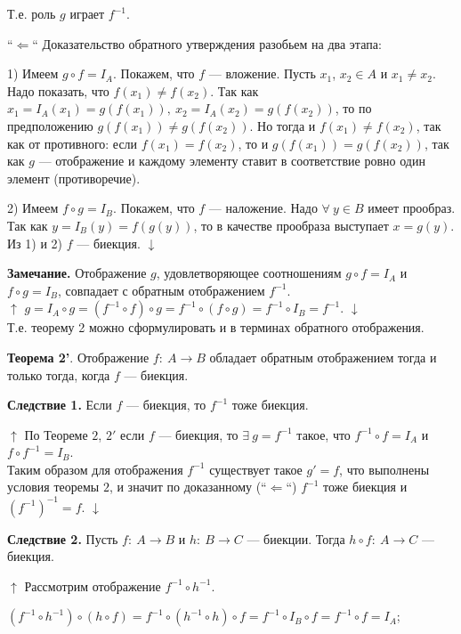 \documentclass{article}
\begin{document}
    Т.е. роль $g$ играет $f^{-1}$.

    ``$\Leftarrow$`` Доказательство обратного утверждения разобьем на два этапа:

    1) Имеем $g \circ f = I_A$. Покажем, что $f$ --- вложение. Пусть $x_1$, $x_2 \in A$ и $x_1 \neq x_2$. Надо показать, что $f(x_1) \neq f(x_2)$. Так как $x_1 = I_A(x_1) = g(f(x_1)),\ x_2 = I_A(x_2) = g(f(x_2))$, то по предположению $g(f(x_1)) \neq g(f(x_2))$. Но тогда и $f(x_1) \neq f(x_2)$, так как от противного: если $f(x_1) = f(x_2)$, то и $g(f(x_1)) = g(f(x_2))$, так как $g$ --- отображение и каждому элементу ставит в соответствие ровно один элемент (противоречие).

    2) Имеем $f \circ g = I_B$. Покажем, что $f$ --- наложение. Надо $\forall\ y \in B$ имеет прообраз.\\
    Так как $y = I_B(y) = f(g(y))$, то в качестве прообраза выступает $x = g(y)$.\\
    Из 1) и 2) $f$ --- биекция. $\downarrow$
    
    \textbf{Замечание.} Отображение $g$, удовлетворяющее соотношениям $g \circ f = I_A$ и $f \circ g = I_B$, совпадает с обратным отображением $f^{-1}$.\\
    $\uparrow$ $g = I_A \circ g = (f^{-1} \circ f) \circ g = f^{-1} \circ (f \circ g) = f^{-1} \circ I_B = f^{-1}$. $\downarrow$\\
    Т.е. теорему 2 можно сформулировать и в терминах обратного отображения.

    \textbf{Теорема 2'}. Отображение $f:\ A \rightarrow B$ обладает обратным отображением тогда и только тогда, когда $f$ --- биекция.
    
    \textbf{Следствие 1.} Если $f$ --- биекция, то $f^{-1}$ тоже биекция.

    $\uparrow$ По Теореме $2$, $2'$ если $f$ --- биекция, то $\exists\ g = f^{-1}$ такое, что $f^{-1} \circ f = I_A$ и $f \circ f^{-1} = I_B$.\\
    Таким образом для отображения $f^{-1}$ существует такое $g' = f$, что выполнены условия теоремы $2$, и значит по доказанному (``$\Leftarrow$``) $f^{-1}$ тоже биекция и $(f^{-1})^{-1} = f$. $\downarrow$

    \textbf{Следствие 2.} Пусть $f:\ A \rightarrow B$ и $h:\ B \rightarrow C$ --- биекции. Тогда $h \circ f:\ A \rightarrow C$ --- биекция.
    
    $\uparrow$ Рассмотрим отображение $f^{-1} \circ h^{-1}$.

    $(f^{-1} \circ h^{-1}) \circ (h \circ f) = f^{-1} \circ (h^{-1} \circ h) \circ f = f^{-1} \circ I_B \circ f = f^{-1} \circ f = I_A$;
\end{document}
